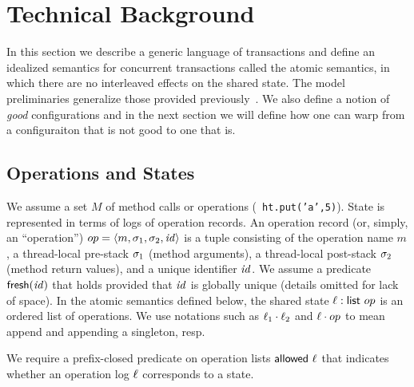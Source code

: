 \newcommand\obseq{\stackrel{\sim}{=}}
\newcommand\CS{\{c,\sigma\}}
\newcommand\CpSp{\{c',\sigma'\}}
\newcommand\numCS[1]{\{c_{#1},\sigma_{#1}\}}

\newcommand\tstep[3]{#1 \lightning (#2,#3)}
\newcommand\stept{\lightning\!\lightning}
\renewcommand\step[3]{#1 \stept (#2,#3)}

\newcommand\BigStep{\Downarrow}


\section{Technical Background}

In this section we describe a generic language of transactions and
define an idealized semantics for concurrent transactions called the
atomic semantics, in which there are no interleaved effects on the
shared state. 
%
The model preliminaries generalize those provided previously~\cite{PMPY}.
%
We also define a notion of \emph{good} configurations
and in the next section we will define how one can warp from a 
configuraiton that is not good to one that is.

\subsection{Operations and States}

We assume a set $M$ of method calls or operations (\eg\
  \texttt{ht.put('a',5)}).
%
State is represented in terms of
logs of operation records. An operation record (or, simply, an ``operation'')
$
    op = \langle m, \sigma_1, \sigma_2, \mathit{id} \rangle
$
is a tuple consisting of the operation name $m$, 
a thread-local pre-stack $\sigma_1$ (method arguments),
a thread-local post-stack $\sigma_2$ (method return values),
and a unique identifier $\mathit{id}$.
%
We assume a predicate $\textsf{fresh}(\mathit{id})$ that holds provided that $\mathit{id}$
is globally unique (details omitted for lack of space).
%
In the atomic semantics defined below, the shared state $\ell :
\textsf{list } op$ is an ordered list of operations.
%
We use notations such as $\ell_1\cdot\ell_2$ and $\ell\cdot op$ to
mean append and appending a singleton, resp.

\begin{parameter} 
We require a prefix-closed predicate on operation lists $\textsf{allowed}\ \ell$
that indicates whether an operation log $\ell$ corresponds to a state.
\end{parameter}


